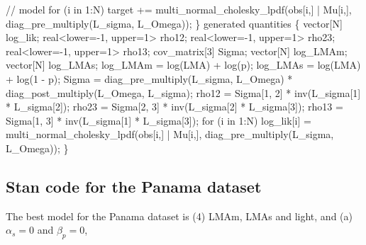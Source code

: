 \documentclass[
  12pt,
  letterpaper,
  DIV=11,
  numbers=noendperiod]{scrartcl}
\newenvironment{Shaded}{\begin{snugshade}}{\end{snugshade}}
\newcommand{\CommentTok}[1]{\textcolor[rgb]{0.37,0.37,0.37}{#1}}
\newcommand{\ControlFlowTok}[1]{\textcolor[rgb]{0.00,0.23,0.31}{#1}}
\newcommand{\DataTypeTok}[1]{\textcolor[rgb]{0.68,0.00,0.00}{#1}}
\newcommand{\DecValTok}[1]{\textcolor[rgb]{0.68,0.00,0.00}{#1}}
\newcommand{\KeywordTok}[1]{\textcolor[rgb]{0.00,0.23,0.31}{#1}}
\newcommand{\NormalTok}[1]{\textcolor[rgb]{0.00,0.23,0.31}{#1}}
\begin{document}
\begin{Shaded}
\begin{Highlighting}[]
  \CommentTok{// model}
  \ControlFlowTok{for}\NormalTok{ (i }\ControlFlowTok{in} \DecValTok{1}\NormalTok{:N)}
     \KeywordTok{target +=}\NormalTok{ multi\_normal\_cholesky\_lpdf(obs[i,] | Mu[i,], diag\_pre\_multiply(L\_sigma, L\_Omega));}
\NormalTok{\}}
\KeywordTok{generated quantities}\NormalTok{ \{}
  \DataTypeTok{vector}\NormalTok{[N] log\_lik;}
  \DataTypeTok{real}\NormalTok{\textless{}}\KeywordTok{lower}\NormalTok{={-}}\DecValTok{1}\NormalTok{, }\KeywordTok{upper}\NormalTok{=}\DecValTok{1}\NormalTok{\textgreater{} rho12;}
  \DataTypeTok{real}\NormalTok{\textless{}}\KeywordTok{lower}\NormalTok{={-}}\DecValTok{1}\NormalTok{, }\KeywordTok{upper}\NormalTok{=}\DecValTok{1}\NormalTok{\textgreater{} rho23;}
  \DataTypeTok{real}\NormalTok{\textless{}}\KeywordTok{lower}\NormalTok{={-}}\DecValTok{1}\NormalTok{, }\KeywordTok{upper}\NormalTok{=}\DecValTok{1}\NormalTok{\textgreater{} rho13;}
  \DataTypeTok{cov\_matrix}\NormalTok{[}\DecValTok{3}\NormalTok{] Sigma;}
  \DataTypeTok{vector}\NormalTok{[N] log\_LMAm;}
  \DataTypeTok{vector}\NormalTok{[N] log\_LMAs;}
\NormalTok{  log\_LMAm = log(LMA) + log(p);}
\NormalTok{  log\_LMAs = log(LMA) + log(}\DecValTok{1}\NormalTok{ {-} p);}
\NormalTok{  Sigma = diag\_pre\_multiply(L\_sigma, L\_Omega)}
\NormalTok{     * diag\_post\_multiply(L\_Omega\textquotesingle{}, L\_sigma);}
\NormalTok{  rho12 = Sigma[}\DecValTok{1}\NormalTok{, }\DecValTok{2}\NormalTok{] * inv(L\_sigma[}\DecValTok{1}\NormalTok{] * L\_sigma[}\DecValTok{2}\NormalTok{]);}
\NormalTok{  rho23 = Sigma[}\DecValTok{2}\NormalTok{, }\DecValTok{3}\NormalTok{] * inv(L\_sigma[}\DecValTok{2}\NormalTok{] * L\_sigma[}\DecValTok{3}\NormalTok{]);}
\NormalTok{  rho13 = Sigma[}\DecValTok{1}\NormalTok{, }\DecValTok{3}\NormalTok{] * inv(L\_sigma[}\DecValTok{1}\NormalTok{] * L\_sigma[}\DecValTok{3}\NormalTok{]);}
  \ControlFlowTok{for}\NormalTok{ (i }\ControlFlowTok{in} \DecValTok{1}\NormalTok{:N)}
\NormalTok{   log\_lik[i] = multi\_normal\_cholesky\_lpdf(obs[i,] | Mu[i,], diag\_pre\_multiply(L\_sigma, L\_Omega));}
\NormalTok{ \}}
\end{Highlighting}
\end{Shaded}

\hypertarget{stan-code-for-the-panama-dataset}{%
\subsection{Stan code for the Panama
dataset}\label{stan-code-for-the-panama-dataset}}

The best model for the Panama dataset is (4) LMAm, LMAs and light, and
(a) \(\alpha_s = 0\) and \(\beta_p = 0\),
\end{document}
